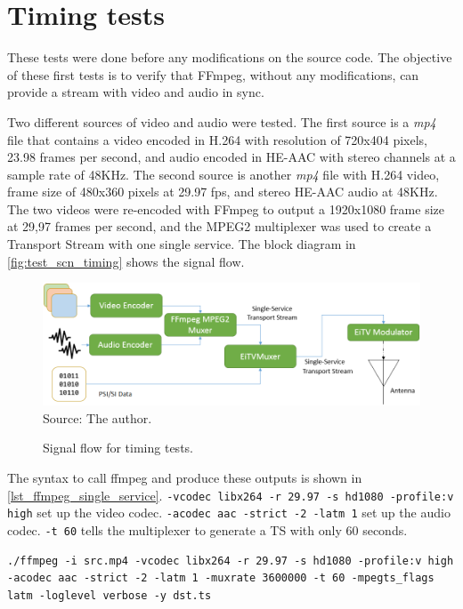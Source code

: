 \documentclass[
	12pt,				%
	openright,			%
	twoside,			%
	a4paper,			%
	brazil,
	french,				%
	english
	]{abntex2}
\begin{document}
\section{Timing tests}

These tests were done before any modifications on the source code. The objective of these first tests is to verify that FFmpeg, without any modifications, can provide a stream with video and audio in sync. 

Two different sources of video and audio were tested. The first source is a \textit{mp4} file that contains a video encoded in H.264 with resolution of 720x404 pixels, 23.98 frames per second, and audio encoded in HE-AAC with stereo channels at a sample rate of 48KHz. The second source is another \textit{mp4} file with H.264 video, frame size of 480x360 pixels at 29.97 fps, and stereo HE-AAC audio at 48KHz. The two videos were re-encoded with FFmpeg to output a 1920x1080 frame size at 29,97 frames per second, and the MPEG2 multiplexer was used to create a Transport Stream with one single service. The block diagram in \autoref{fig:test_scn_timing} shows the signal flow.

\begin{figure}[!hb]
\centering
\caption{Signal flow for timing tests.}
\includegraphics[width=0.9\linewidth]{figuras/test_scn_timing.png}
\\Source: The author.
\label{fig:test_scn_timing}
\end{figure}

The syntax to call ffmpeg and produce these outputs is shown in \autoref{lst_ffmpeg_single_service}. \texttt{-vcodec libx264 -r 29.97 -s hd1080 -profile:v high} set up the video codec. \texttt{-acodec aac -strict -2 -latm 1} set up the audio codec. \texttt{-t 60} tells the multiplexer to generate a TS with only 60 seconds.

\begin{lstlisting}[caption={}, label={lst_ffmpeg_single_service}]
./ffmpeg -i src.mp4 -vcodec libx264 -r 29.97 -s hd1080 -profile:v high -acodec aac -strict -2 -latm 1 -muxrate 3600000 -t 60 -mpegts_flags latm -loglevel verbose -y dst.ts
\end{lstlisting}
\end{document}
